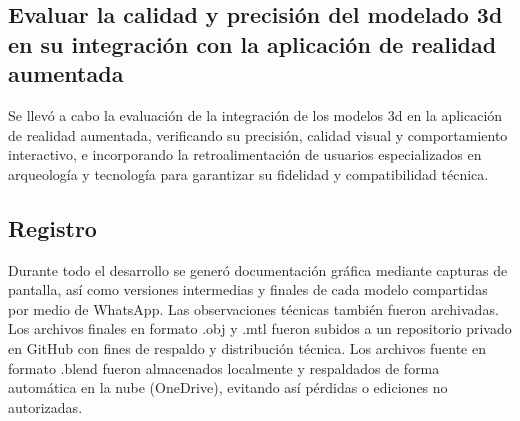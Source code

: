 \subsection{Evaluar la calidad y precisión del modelado 3d en su integración con la aplicación de realidad aumentada}
Se llevó a cabo la evaluación de la integración de los modelos \gls{3d} en la aplicación de realidad aumentada, verificando su precisión, calidad visual y comportamiento interactivo, e incorporando la retroalimentación de usuarios especializados en arqueología y tecnología para garantizar su fidelidad y compatibilidad técnica.

\subsection{Registro}
Durante todo el desarrollo se generó documentación gráfica mediante capturas de pantalla, así como versiones intermedias y finales de cada modelo compartidas por medio de WhatsApp. Las observaciones técnicas también fueron archivadas. Los archivos finales en formato .obj y .mtl fueron subidos a un repositorio privado en GitHub con fines de respaldo y distribución técnica. Los archivos fuente en formato .blend fueron almacenados localmente y respaldados de forma automática en la nube (OneDrive), evitando así pérdidas o ediciones no autorizadas.
